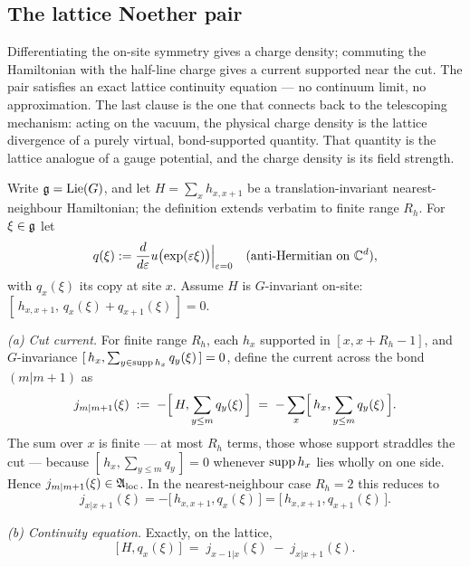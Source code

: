 \subsection{The lattice Noether pair}

Differentiating the on-site symmetry gives a charge density; commuting the
Hamiltonian with the half-line charge gives a current supported near the cut.
The pair satisfies an exact lattice continuity equation --- no continuum limit,
no approximation. The last clause is the one that connects back to the
telescoping mechanism: acting on the vacuum, the physical charge density is the
lattice divergence of a purely virtual, bond-supported quantity. That
quantity is the lattice analogue of a gauge potential, and the charge density
is its field strength.

\begin{definition}
\label{def:noether-pair}
Write $\mathfrak{g} = \mathrm{Lie}(G)$, and let $H = \sum_{x} h_{x,x+1}$ be a
translation-invariant nearest-neighbour Hamiltonian; the definition extends
verbatim to finite range $R_{h}$. For $\xi \in \mathfrak{g}$ let
\begin{equation}
  q(\xi) := \frac{d}{d\varepsilon} u\bigl(\exp(\varepsilon\xi)\bigr)
  \Big\vert_{\varepsilon=0}
  \quad \text{(anti-Hermitian on } \mathbb{C}^{d} \text{)},
\end{equation}
with $q_{x}(\xi)$ its copy at site $x$. Assume $H$ is $G$-invariant on-site:
$[\,h_{x,x+1},\, q_{x}(\xi) + q_{x+1}(\xi)\,] = 0$.

\emph{(a) Cut current.} For finite range $R_{h}$, each $h_{x}$ supported in
$[x, x+R_{h}-1]$, and $G$-invariance
$[\,h_{x}, \sum_{y \in \operatorname{supp} h_{x}} q_{y}(\xi)\,] = 0$, define the current
across the bond $(m|m+1)$ as
\begin{equation}
  j_{m|m+1}(\xi) \; := \; -\Bigl[\, H, \sum_{y \le m} q_{y}(\xi) \,\Bigr]
  \; = \; -\sum_{x} \Bigl[\, h_{x}, \sum_{y \le m} q_{y}(\xi) \,\Bigr].
  \label{eq:cut-current}
\end{equation}
The sum over $x$ is finite --- at most $R_{h}$ terms, those whose support
straddles the cut --- because $[\,h_{x}, \sum_{y \le m} q_{y}\,] = 0$ whenever
$\operatorname{supp} h_{x}$ lies wholly on one side. Hence
$j_{m|m+1}(\xi) \in \mathfrak{A}_{\mathrm{loc}}$. In the nearest-neighbour case $R_{h} = 2$ this
reduces to
\begin{equation}
  j_{x|x+1}(\xi) = -\bigl[\, h_{x,x+1}, q_{x}(\xi) \,\bigr]
                 = \bigl[\, h_{x,x+1}, q_{x+1}(\xi) \,\bigr].
\end{equation}

\emph{(b) Continuity equation.} Exactly, on the lattice,
\begin{equation}
  \bigl[\, H, q_{x}(\xi) \,\bigr]
  \;=\; j_{x-1|x}(\xi) \; - \; j_{x|x+1}(\xi) .
  \label{eq:continuity}
\end{equation}
\end{definition}

